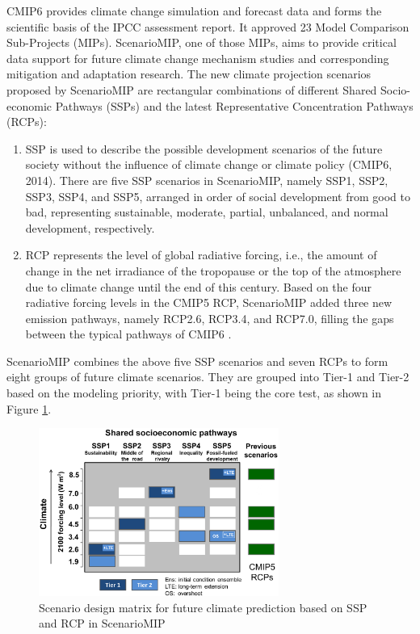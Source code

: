 \documentclass[twocolumn, a4paper,10pt]{article}
\providecommand{\DIFaddbegin}{} %
\providecommand{\DIFaddend}{} %
\providecommand{\DIFdelbegin}{} %
\providecommand{\DIFdelend}{} %
\providecommand{\DIFaddbeginFL}{} %
\providecommand{\DIFaddendFL}{} %
\providecommand{\DIFdelbeginFL}{} %
\providecommand{\DIFdelendFL}{} %
\newcommand{\DIFscaledelfig}{0.5}
\newlength{\DIFdelgraphicswidth} %
\newlength{\DIFdelgraphicsheight} %
\newcommand{\DIFaddincludegraphics}[2][]{{\color{blue}\fbox{\DIFOincludegraphics[#1]{#2}}}} %
\newcommand{\DIFdelincludegraphics}[2][]{%
\sbox{\DIFdelgraphicsbox}{\DIFOincludegraphics[#1]{#2}}%
\settoboxwidth{\DIFdelgraphicswidth}{\DIFdelgraphicsbox} %
\settoboxtotalheight{\DIFdelgraphicsheight}{\DIFdelgraphicsbox} %
\scalebox{\DIFscaledelfig}{%
\parbox[b]{\DIFdelgraphicswidth}{\usebox{\DIFdelgraphicsbox}\\[-\baselineskip] \rule{\DIFdelgraphicswidth}{0em}}\llap{\resizebox{\DIFdelgraphicswidth}{\DIFdelgraphicsheight}{%
\setlength{\unitlength}{\DIFdelgraphicswidth}%
\begin{picture}(1,1)%
\thicklines\linethickness{2pt} %
{\color[rgb]{1,0,0}\put(0,0){\framebox(1,1){}}}%
{\color[rgb]{1,0,0}\put(0,0){\line( 1,1){1}}}%
{\color[rgb]{1,0,0}\put(0,1){\line(1,-1){1}}}%
\end{picture}%
}\hspace*{3pt}}} %
} %
\DeclareRobustCommand{\DIFaddbegin}{\DIFOaddbegin \let\includegraphics\DIFaddincludegraphics} %
\DeclareRobustCommand{\DIFaddend}{\DIFOaddend \let\includegraphics\DIFOincludegraphics} %
\DeclareRobustCommand{\DIFdelbegin}{\DIFOdelbegin \let\includegraphics\DIFdelincludegraphics} %
\DeclareRobustCommand{\DIFdelend}{\DIFOaddend \let\includegraphics\DIFOincludegraphics} %
\DeclareRobustCommand{\DIFaddbeginFL}{\DIFOaddbeginFL \let\includegraphics\DIFaddincludegraphics} %
\DeclareRobustCommand{\DIFaddendFL}{\DIFOaddendFL \let\includegraphics\DIFOincludegraphics} %
\DeclareRobustCommand{\DIFdelbeginFL}{\DIFOdelbeginFL \let\includegraphics\DIFdelincludegraphics} %
\DeclareRobustCommand{\DIFdelendFL}{\DIFOaddendFL \let\includegraphics\DIFOincludegraphics} %
\begin{document}
CMIP6 provides climate change simulation and forecast data and forms the
scientific basis of the IPCC assessment report. It approved 23 Model Comparison
Sub-Projects (MIPs). ScenarioMIP, one of those MIPs, aims to provide critical
data support for future climate change mechanism studies and corresponding
mitigation and adaptation research. The new climate projection scenarios
proposed by ScenarioMIP are rectangular combinations of different Shared
Socio-economic Pathways (SSPs) and the latest Representative Concentration
Pathways (RCPs):

\begin{enumerate}
\def\labelenumi{\arabic{enumi}.}
\item
  SSP is used to describe the possible development scenarios of the future
  society without the influence of climate change or climate policy (CMIP6,
  2014). There are five SSP scenarios in ScenarioMIP, namely SSP1, SSP2, SSP3,
  SSP4, and SSP5, arranged in order of social development from good to bad,
  representing sustainable, moderate, partial, unbalanced, and normal
  development, respectively.
\item
  RCP represents the level of global radiative forcing, i.e., the amount of
  change in the net irradiance of the tropopause or the top of the atmosphere
  due to climate change until the end of this century. Based on the four
  radiative forcing levels in the CMIP5 RCP, ScenarioMIP added three new
  emission pathways, namely RCP2.6, RCP3.4, and RCP7.0, filling the gaps
  between the typical pathways of CMIP6 \citep{oneill2016scenario}.
\end{enumerate}

ScenarioMIP combines the above five SSP scenarios and seven RCPs to form eight
groups of future climate scenarios. They are grouped into Tier-1 and Tier-2
based on the modeling priority, with Tier-1 being the core test, as shown in
Figure \ref{fig:ssp}.

\DIFdelbegin %
\DIFdelendFL \DIFaddbeginFL \begin{figure}
\includegraphics[width=0.7\textwidth]{figures/ssp-hires} \DIFaddendFL \caption{Scenario design matrix for future climate prediction based on SSP  and RCP in ScenarioMIP\citep{oneill2016scenario}}\label{fig:ssp}
\DIFdelbeginFL %
\DIFdelend \DIFaddbegin \end{figure}
\DIFaddend 
\end{document}
